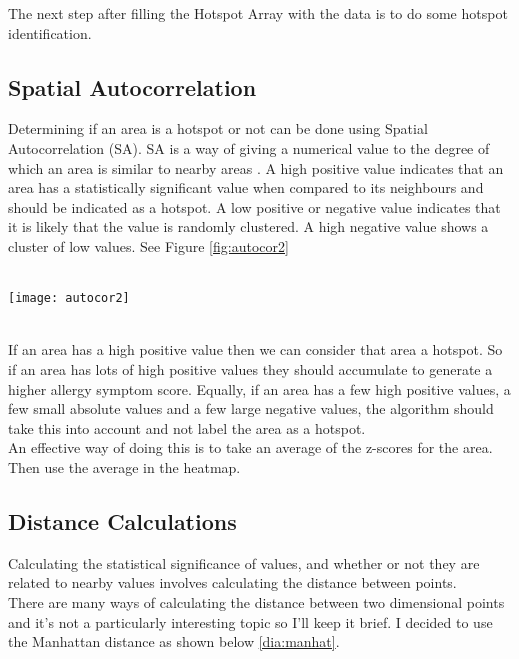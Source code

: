 The next step after filling the Hotspot Array with the data is to do some hotspot identification.

\subsection{Spatial Autocorrelation}

Determining if an area is a hotspot or not can be done using Spatial Autocorrelation (SA). SA is a way of giving a numerical value to the degree of which an area is similar to nearby areas \cite{autocor} . A high positive value indicates that an area has a statistically significant value when compared to its neighbours and should be indicated as a hotspot. A low positive or negative value indicates that it is likely that the value is randomly clustered. A high negative value shows a cluster of low values. See Figure \ref{fig:autocor2}\\

\begin{SCfigure}
\label{fig:autocor2}
\caption{Figure \ref{fig:autocor2} : Spatial Autocorrelation}\\
\centering
\texttt{[image: autocor2]}
\centering
\end{SCfigure}\\

If an area has a high positive value then we can consider that area a hotspot. So if an area has lots of high positive values they should accumulate to generate a higher allergy symptom score. Equally, if an area has a few high positive values, a few small absolute values and a few large negative values, the algorithm should take this into account and not label the area as a hotspot.\\

An effective way of doing this is to take an average of the z-scores for the area. Then use the average in the heatmap.

\subsection{Distance Calculations}

Calculating the statistical significance of values, and whether or not they are related to nearby values involves calculating the distance between points.\\

There are many ways of calculating the distance between two dimensional points and it's not a particularly interesting topic so I'll keep it brief. I decided to use the Manhattan distance as shown below \ref{dia:manhat}.\\

